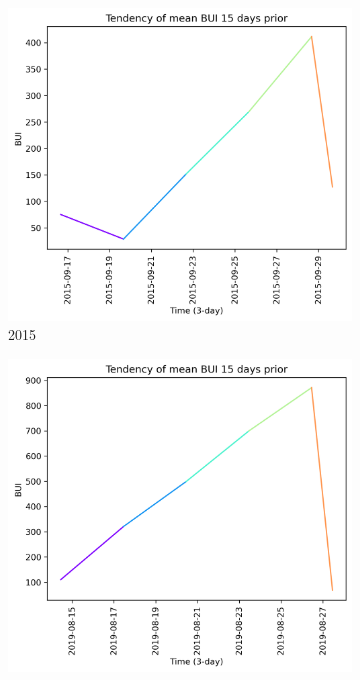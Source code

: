 \begin{figure}[h]
    \centering
    \caption{BUI values 15 days prior to wildfire}
    \begin{subfigure}{0.3\textwidth}
        \centering
        \includegraphics[width=\textwidth]{graphs/15days/2015_15daysprior_tendency_graph_BUI.png}
        \caption{2015}
        \label{fig:bui_prior_15_days_2015}
    \end{subfigure}
    \hfill
    \begin{subfigure}{0.3\textwidth}
        \centering
        \includegraphics[width=\textwidth]{graphs/15days/2019_15daysprior_tendency_graph_BUI.png}

\end{subfigure}
\end{figure}
